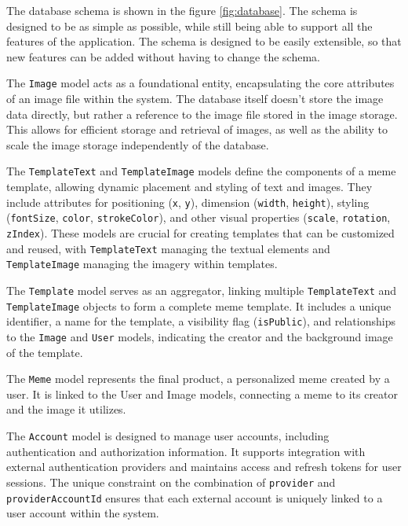 \label{sec:db-schema}

The database schema is shown in the figure \ref{fig:database}. The schema is designed to be as simple as possible, while still being able to support all the features of the application. The schema is designed to be easily extensible, so that new features can be added without having to change the schema.

The \texttt{Image} model acts as a foundational entity, encapsulating the core attributes of an image file within the system. The database itself doesn't store the image data directly, but rather a reference to the image file stored in the image storage. This allows for efficient storage and retrieval of images, as well as the ability to scale the image storage independently of the database.

The \texttt{TemplateText} and \texttt{TemplateImage} models define the components of a meme template, allowing dynamic placement and styling of text and images. They include attributes for positioning (\texttt{x}, \texttt{y}), dimension (\texttt{width}, \texttt{height}), styling (\texttt{fontSize}, \texttt{color}, \texttt{strokeColor}), and other visual properties (\texttt{scale}, \texttt{rotation}, \texttt{zIndex}). These models are crucial for creating templates that can be customized and reused, with \texttt{TemplateText} managing the textual elements and \texttt{TemplateImage} managing the imagery within templates.

The \texttt{Template} model serves as an aggregator, linking multiple \texttt{TemplateText} and \texttt{TemplateImage} objects to form a complete meme template. It includes a unique identifier, a name for the template, a visibility flag (\texttt{isPublic}), and relationships to the \texttt{Image} and \texttt{User} models, indicating the creator and the background image of the template.

The \texttt{Meme} model represents the final product, a personalized meme created by a user. It is linked to the User and Image models, connecting a meme to its creator and the image it utilizes.

The \texttt{Account} model is designed to manage user accounts, including authentication and authorization information. It supports integration with external authentication providers and maintains access and refresh tokens for user sessions. The unique constraint on the combination of \texttt{provider} and \texttt{providerAccountId} ensures that each external account is uniquely linked to a user account within the system.

